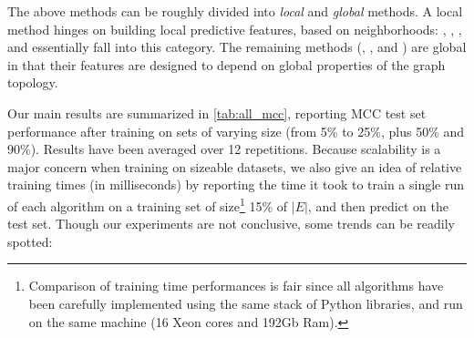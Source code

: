 The above methods can be roughly divided into \emph{local} and \emph{global} methods. A local method
hinges on building local predictive features, based on neighborhoods: \usrule{}, \uslogregp{},
\comptriads{}, and \compbayesian{} essentially fall into this category. The remaining methods
(\uslpropGsec{}, \complowrank{}, \compmaxnorm{} and \compranknodes{}) are global in that their
features are
designed to depend on global properties of the graph topology.

\iffalse
First, with label propagation (referred to as \uslprop{} in the following). We
initialize the labels vector $f_0$ to $|V'|$ random values drawn uniformly in
$[0, 1]$ and set the label of the training edges equal to their observed value.
Let the adjacency matrix of $G'$ be $A$, its diagonal degree matrix
be $D$, its diameter be $\diam{G'}$ and $P$ be the following sparse matrix $P=D^{-1}A$. This allow performing
one round of label propagation as $f_{t+1} = Pf_t$, followed by clamping the
training labels. Each round thus involves $2|E|$ multiplications and we do
$\diam{G'}$ of them\footnote{$\diam{G'}$ is a small constant, ranging from $16$
for \aut{} to $38$ for \epi{}}. With the computed labels, we can associate each
edge $\eij$ with $a_{i,j} = \nicefrac{1}{2}\left(f_{\diam{G'}}(\iout) +
f_{\diam{G'}}(\jin)\right)$.
By sorting the $a$ values of the training edges, we can find the threshold $t$
that minimizes the number of mistakes on the training set while predicting
$\yij = \sgn\left(a_{i,j} - t\right)$ in $O(|\trainset{}|\log |\trainset{}|)$
time.

Then we again associate each edge $\eij$ with $a_{i,j} = \left(1-\htr(i)\right) +
\left(1-\hun(j)\right)$ and find the $\tau$ of \eqref{eq:predictor} that minimizes the empirical
risk.  Another way to exploit those quantities is to train a Logistic Regression model where each
edge is associated with two features: $[1-\htr(i), 1-\hun(j)]$ (we call this method \uslogregp{}).
\fi

\bigskip

Our main results are summarized in \autoref{tab:all_mcc}, reporting MCC test set performance after
training on sets of varying size (from 5\% to 25\%, plus 50\% and 90\%). Results have been averaged
over 12 repetitions.
Because scalability is a major concern when training on sizeable datasets, we also give an idea of
relative training times (in milliseconds) by reporting the time it took to train a single run of
each algorithm on a training set of size\footnote{Comparison of training time performances is fair
since all algorithms have been carefully implemented using the same stack of Python libraries, and
run on the same machine (16 Xeon cores and 192Gb Ram).} 15\% of $|E|$, and then predict on the test
set. Though our experiments are not conclusive, some trends can be readily spotted:

